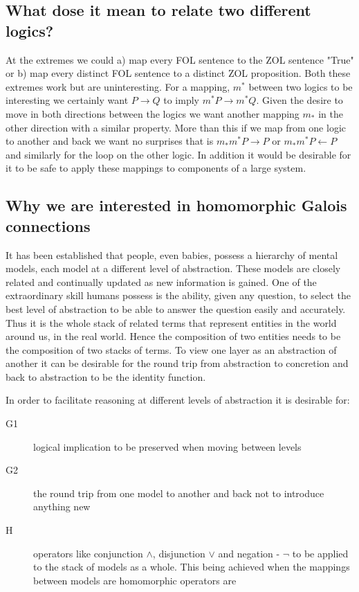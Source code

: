 \subsection{What dose it mean to relate two different logics?}
At the extremes  we could a) map every FOL sentence to the ZOL sentence "True" or
b) map every distinct FOL sentence to a distinct ZOL proposition. Both these extremes work but are uninteresting. For a mapping, $m^*$  between two logics to be interesting we certainly want $P\rightarrow Q$ to imply $m^*P \rightarrow m^*Q$. Given the desire to move in both directions between the logics we want another mapping $m_*$ in the other direction with a similar property. More than this if we map from one logic to another and back we want no surprises that is $m_*m^*P \rightarrow P$ or 
$m_*m^*P \leftarrow P$ and similarly for the loop on the other logic.
In addition it would be desirable for it to be safe  to apply these mappings to components of a large system.


\subsection{Why we are interested in homomorphic Galois connections}
It has been established that people, even babies,  possess a hierarchy of mental models, each model at a different level of abstraction. These models are closely related and continually updated as new information is gained. One of the extraordinary skill humans possess is the ability, given any question,  to select the  best level of abstraction to be able to answer the question easily and accurately.  Thus it is the whole stack of related terms that represent entities in the world around us, in the real world. Hence the composition of two entities needs to be the composition of two stacks of terms. To  view one layer as  an abstraction of another it can be desirable for the round trip from abstraction to concretion and back to abstraction to be the identity function.


In order to facilitate reasoning at different levels of abstraction it is desirable for:
\begin{description}
\item[G1] logical implication to be preserved when moving between levels
\item[G2] the round trip from one model to another and back not to introduce anything new
\item[H] operators like conjunction $\wedge$, disjunction $\vee$ and negation - $\neg$ to be applied to the stack of models as a whole. This being achieved when the mappings between models are homomorphic operators are 
\end{description}



